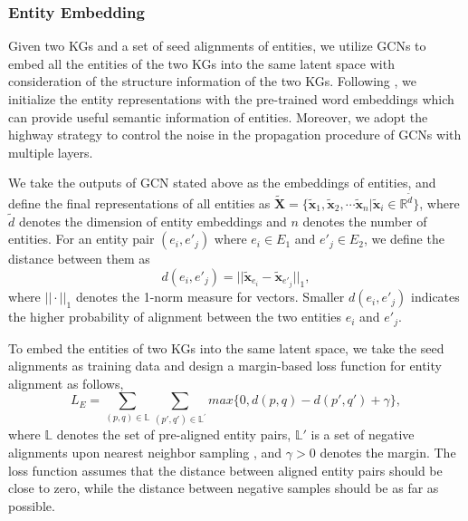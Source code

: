 \documentclass[letterpaper]{article} %
\begin{document}
\subsubsection{Entity Embedding}
Given two KGs and a set of seed alignments of entities, we utilize
GCNs to embed all the entities of the two KGs into the same latent
space with consideration of the structure information of the two
KGs. Following \cite{xu2019cross, wu2020neighborhood}, we
initialize the entity representations with the pre-trained word
embeddings which can provide useful semantic information of
entities. Moreover, we adopt the highway
strategy \cite{srivastava2015highway} to control the noise in the propagation
procedure of GCNs with multiple layers.



We take the outputs of GCN stated above as the embeddings of
entities, and define the final representations of all entities as
$\tilde{\bm{X}} = \{ \tilde{\bm{x}}_{1}, \tilde{\bm{x}}_{2}, \cdots
\tilde{\bm{x}}_{n} | \tilde{\bm{x}}_{i} \in \mathbb{R}^{\tilde{d}}
\}$, where $\tilde{d}$ denotes the dimension of entity embeddings
and $n$ denotes the number of entities. For an entity pair
$(e_i,e'_j)$ where $e_i \in E_1$ and $e'_j \in E_2$, we define the
distance between them as
\begin{equation}
d(e_i, e'_j) = || \tilde{\bm{x}}_{e_i} - \tilde{\bm{x}}_{e'_j}
||_{1},
\end{equation}
where $|| \cdot ||_1$ denotes the 1-norm measure for vectors.
Smaller $d(e_i,e'_j)$ indicates the higher probability of alignment
between the two entities $e_i$ and $e'_j$.

To embed the entities of two KGs into the same latent space, we take
the seed alignments as training data and design a margin-based loss
function for entity alignment as follows,
\begin{equation}
L_E = \sum_{(p,q)\in \mathbb{L}} \sum_{(p',q')\in \mathbb{L}^{'}}
max\{0, d(p,q) - d(p',q') + \gamma\}, \label{loss_e}
\end{equation}
where $\mathbb{L}$ denotes the set of pre-aligned entity pairs,
$\mathbb{L}'$ is a set of negative alignments upon nearest neighbor
sampling \cite{wu2020neighborhood}, and $\gamma > 0$ denotes the margin. 
The loss function
assumes that the distance between aligned entity pairs should be
close to zero, while the distance between negative samples should be
as far as possible.
\end{document}
